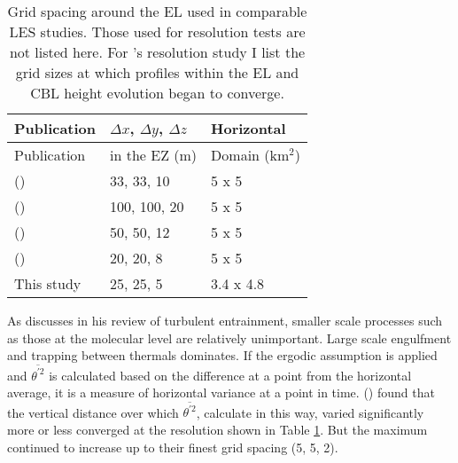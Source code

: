 \begin{table}[htbp]
\caption[]{Grid spacing around the \acs{EL} used in comparable \acs{LES} studies. Those used for resolution tests are not listed here.  For \citeauthor{SullPat}'s \citeyear{SullPat} resolution study I list the grid sizes at which profiles within the \acs{EL} and \acs{CBL} height evolution began to converge.}

    \begin{center}
    \begin{tabular}{ p{5cm} p{3cm} p{3cm}}
Publication & $\Delta x$, $\Delta y$, $\Delta z$ & Horizontal \\ \hline
Publication & in the \acs{EZ} (m)& Domain (km$^{2}$) \\ \hline
      \citeauthor{SullMoengStev} (\citeyear{SullMoengStev}) & 33, 33, 10 & 5 x 5 \\ %
      \citeauthor{FedConzMir04} (\citeyear{FedConzMir04}) & 100, 100, 20 & 5 x 5 \\ [.3cm] %
      \citeauthor{BrooksFowler2} (\citeyear{BrooksFowler2}) & 50, 50, 12 & 5 x 5 \\%
      \citeauthor{SullPat} (\citeyear{SullPat}) &  20, 20, 8 & 5 x 5\\ %
      This study & 25, 25, 5 &  3.4 x 4.8\\ \hline       
    \end{tabular}
\label{table:gridcomp}   
\end{center}    
\end{table}


As \citeauthor{Turner86} discusses in his \citeyear{Turner86} review of turbulent entrainment, smaller scale processes such as those at the molecular level are relatively unimportant.  Large scale engulfment and trapping between thermals dominates.  If the ergodic assumption is applied and $\overline{\theta^{'2}}$ is calculated based on the difference at a point from the horizontal average, it is a measure of horizontal variance at a point in time.  \citeauthor{SullPat} (\citeyear{SullPat}) found that the vertical distance over which $\overline{\theta^{'2}}$, calculate in this way, varied significantly more or less converged at the resolution shown in Table \ref{table:gridcomp}.  But the maximum continued to increase up to their finest grid spacing (5, 5, 2).\\

